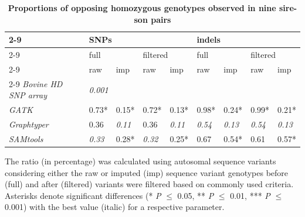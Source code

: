 \documentclass[../main.tex]{subfiles}
\begin{document}
\begin{table}
            \begin{center}
            \caption{\textbf{Proportions of opposing homozygous genotypes observed in nine sire-son pairs}}
            \small
            \begin{tabular}{|l|l|l|l|l|l|l|l|l|} 
            \cline{2-9}
            \multicolumn{1}{l!{\color{black}\vrule}}{~} & \multicolumn{4}{l|}{SNPs}                                     & \multicolumn{4}{l|}{indels}                                    \\ 
            \cline{2-9}
            \multicolumn{1}{l|}{~}                      & \multicolumn{2}{l|}{full}     & \multicolumn{2}{l|}{filtered} & \multicolumn{2}{l|}{full}     & \multicolumn{2}{l|}{filtered}  \\ 
            \cline{2-9}
            \multicolumn{1}{l|}{~}                      & raw           & imp           & raw           & imp           & raw           & imp           & raw           & imp            \\ 
            \cline{2-9}
            \textit{Bovine HD SNP array}                & \multicolumn{8}{l|}{\textit{0.001}}                                                                                            \\ 
            \hline
            \textit{GATK}                               & 0.73*         & 0.15*         & 0.72*         & 0.13*         & 0.98*         & 0.24*         & 0.99*         & 0.21*          \\ 
            \hline
            \textit{Graphtyper}                         & 0.36          & \textit{0.11} & 0.36          & \textit{0.11} & \textit{0.54} & \textit{0.13} & \textit{0.54} & \textit{0.13}  \\ 
            \hline
            \textit{SAMtools}                           & \textit{0.33} & 0.28*         & \textit{0.32} & 0.25*         & 0.67          & 0.54*         & 0.61          & 0.57*          \\
            \hline
            \end{tabular}
            \label{tab:mendel}
            \end{center}
            \singlespacing
            \small{The ratio (in percentage) was calculated using autosomal sequence variants considering either 
            the raw or imputed (imp) sequence variant genotypes before (full) and after (filtered) variants were filtered based on commonly used criteria. 
            Asterisks denote significant differences (* \emph{P} $\leq$ 0.05, ** \emph{P} $\leq$ 0.01, *** \emph{P} $\leq$ 0.001) with the best value (italic) for a respective parameter.}

\end{table}
\end{document}
